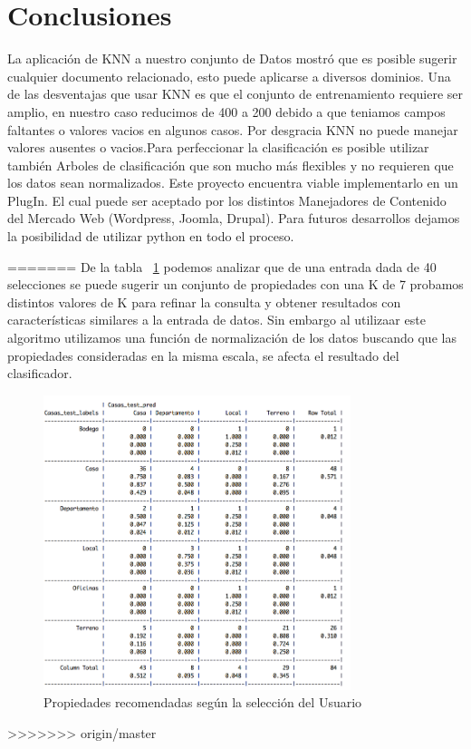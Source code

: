 \section{Conclusiones}
La aplicación de KNN a nuestro conjunto de Datos mostró que es posible sugerir cualquier documento relacionado, esto puede aplicarse a diversos dominios. Una de las desventajas que usar KNN es que el conjunto de entrenamiento requiere ser amplio, en nuestro caso reducimos de 400 a 200 debido a que teniamos campos faltantes o valores vacios en algunos casos. Por desgracia KNN no puede manejar valores ausentes o vacios.Para perfeccionar la clasificación es posible utilizar también Arboles de clasificación que son mucho más flexibles y no requieren que los datos sean normalizados. Este proyecto encuentra viable implementarlo en un PlugIn. El cual puede ser aceptado por los distintos Manejadores de Contenido del Mercado Web (Wordpress, Joomla, Drupal).  Para futuros desarrollos dejamos la posibilidad de utilizar python en todo el proceso. 



=======
De la tabla ~\ref{fig:Clasificador} podemos analizar que de una entrada dada de 40 selecciones se puede sugerir un conjunto de propiedades con una K de 7 probamos distintos valores de K para refinar la consulta y obtener resultados con características similares a la entrada de datos.
Sin embargo al utilizaar este algoritmo utilizamos una función de normalización de los datos buscando que las propiedades consideradas en la misma escala, se afecta el resultado del clasificador.


\begin{figure}[ht!]
\centering
\includegraphics[width=0.8\textwidth]{ModeloPredictivo.png}
\caption{Propiedades recomendadas según la selección del Usuario}
\label{fig:Clasificador}
\end{figure}
>>>>>>> origin/master
